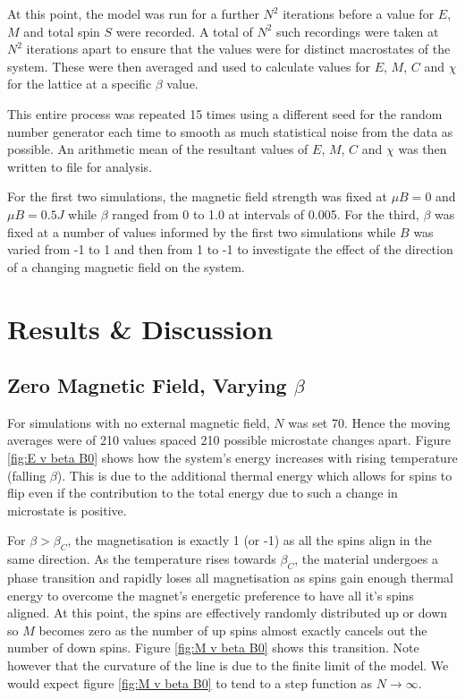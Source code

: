 \documentclass[11pt]{article}   	%
\begin{document}
At this point, the model was run for a further $N^2$ iterations before a value for $E$, $M$ and total spin $S$ were recorded. A total of $N^2$ such recordings were taken at $N^2$ iterations apart to ensure that the values were for distinct macrostates of the system. These were then averaged and used to calculate values for $E$, $M$, $C$ and $\chi$ for the lattice at a specific $\beta$ value.

This entire process was repeated 15 times using a different seed for the random number generator each time to smooth as much statistical noise from the data as possible. An arithmetic mean of the resultant values of $E$, $M$, $C$ and $\chi$ was then written to file for analysis.

For the first two simulations, the magnetic field strength was fixed at $\mu B = 0$ and $\mu B = 0.5J$ while $\beta$ ranged from 0 to 1.0 at intervals of 0.005. For the third, $\beta$ was fixed at a number of values informed by the first two simulations while $B$ was varied from -1 to 1 and then from 1 to -1 to investigate the effect of the direction of a changing magnetic field on the system.

\section{Results \& Discussion}
\subsection{Zero Magnetic Field, Varying $\beta$}
For simulations with no external magnetic field, $N$ was set 70. Hence the moving averages were of 210 values spaced 210 possible microstate changes apart. 
Figure \ref{fig:E v beta B0} shows how the system's energy increases with rising temperature (falling $\beta$). This is due to the additional thermal energy which allows for spins to flip even if the contribution to the total energy due to such a change in microstate is positive.

For $\beta > \beta_C$, the magnetisation is exactly 1 (or -1) as all the spins align in the same direction. As the temperature rises towards $\beta_C$, the material undergoes a phase transition and rapidly loses all magnetisation as spins gain enough thermal energy to overcome the magnet's energetic preference to have all it's spins aligned. At this point, the spins are effectively randomly distributed up or down so $M$ becomes zero as the number of up spins almost exactly cancels out the number of down spins. Figure \ref{fig:M v beta B0} shows this transition. Note however that the curvature of the line is due to the finite limit of the model. We would expect figure \ref{fig:M v beta B0} to tend to a step function as $N \rightarrow \infty$.
\end{document}
